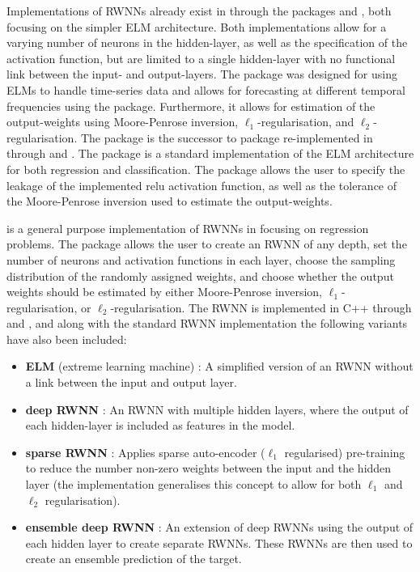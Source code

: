 \documentclass[
]{jss}
\providecommand{\tightlist}{%
  \setlength{\itemsep}{0pt}\setlength{\parskip}{0pt}}
\begin{document}
Implementations of RWNNs already exist in  through the
packages  \citep{nnfor} and 
\citep{elmNNRcpp}, both focusing on the simpler ELM architecture. Both
implementations allow for a varying number of neurons in the
hidden-layer, as well as the specification of the activation function,
but are limited to a single hidden-layer with no functional link between
the input- and output-layers. The  package was designed for
using ELMs to handle time-series data and allows for forecasting at
different temporal frequencies using the  package.
Furthermore, it allows for estimation of the output-weights using
Moore-Penrose inversion, \(\ell_1\)-regularisation, and
\(\ell_2\)-regularisation. The  package is the successor
to  package \citep{elmNN} re-implemented in 
through  and  \citep[\citet{RcppA}]{Rcpp}.
The package is a standard implementation of the ELM architecture for
both regression and classification. The package allows the user to
specify the leakage of the implemented relu activation function, as well
as the tolerance of the Moore-Penrose inversion used to estimate the
output-weights.

 is a general purpose implementation of RWNNs in 
\citep{R} focusing on regression problems. The  package allows
the user to create an RWNN of any depth, set the number of neurons and
activation functions in each layer, choose the sampling distribution of
the randomly assigned weights, and choose whether the output weights
should be estimated by either Moore-Penrose inversion,
\(\ell_1\)-regularisation, or \(\ell_2\)-regularisation. The RWNN is
implemented in C++ through  and , and along
with the standard RWNN implementation the following variants have also
been included:

\begin{itemize}
\tightlist
\item
  \textbf{ELM} (extreme learning machine) \citep{Huang2006}: A
  simplified version of an RWNN without a link between the input and
  output layer.
\item
  \textbf{deep RWNN} \citep{Henriquez2018}: An RWNN with multiple hidden
  layers, where the output of each hidden-layer is included as features
  in the model.
\item
  \textbf{sparse RWNN} \citep{Zhang2019}: Applies sparse auto-encoder
  (\(\ell_1\) regularised) pre-training to reduce the number non-zero
  weights between the input and the hidden layer (the implementation
  generalises this concept to allow for both \(\ell_1\) and \(\ell_2\)
  regularisation).
\item
  \textbf{ensemble deep RWNN} \citep{Shi2021}: An extension of deep
  RWNNs using the output of each hidden layer to create separate RWNNs.
  These RWNNs are then used to create an ensemble prediction of the
  target.
\end{itemize}
\end{document}
